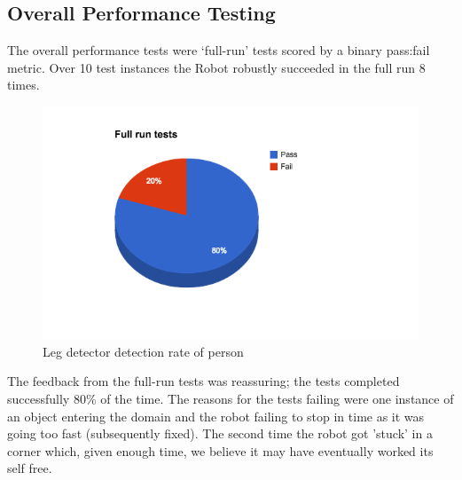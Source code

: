 \documentclass{article}
\begin{document}
\begin{multicols}{2}
	\subsection{Overall Performance Testing}
	The overall performance tests were ‘full-run’ tests scored by a binary pass:fail metric. Over 10 test instances the Robot robustly succeeded in the full run 8 times. 
	\begin{figure}[H]
	\centering
	\includegraphics[width=\linewidth]{ExperimentalResults13}
	\caption{Leg detector detection rate of person}
	\end{figure}
	The feedback from the full-run tests was reassuring; the tests completed successfully 80\% of the time. The reasons for the tests failing were one instance of an object entering the domain and the robot failing to stop in time as it was going too fast (subsequently fixed). The second time the robot got 'stuck' in a corner which, given enough time, we believe it may have eventually worked its self free.
	\end{multicols}
\end{document}

